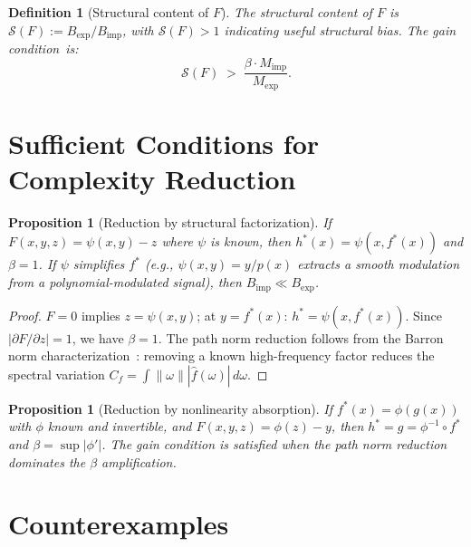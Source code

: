 \documentclass[12pt]{article}
\newtheorem{proposition}[theorem]{Proposition}
\newtheorem{definition}[theorem]{Definition}
\newcommand{\norm}[1]{\left\|#1\right\|}
\begin{document}
\begin{definition}[Structural content of $F$]
\label{def:structural_content}
The structural content of $F$ is
$\mathcal{S}(F) := B_{\mathrm{exp}} / B_{\mathrm{imp}}$,
with $\mathcal{S}(F) > 1$ indicating useful structural bias.
The gain condition~is:
\begin{equation}
  \mathcal{S}(F) \;>\;
  \frac{\beta \cdot M_{\mathrm{imp}}}{M_{\mathrm{exp}}}.
  \label{eq:condicion_S}
\end{equation}
\end{definition}

\section{Sufficient Conditions for Complexity Reduction}
\label{sec:sufficient}

\begin{proposition}[Reduction by structural factorization]
\label{prop:factorizacion}
If $F(x, y, z) = \psi(x, y) - z$ where $\psi$ is known,
then $h^*(x) = \psi(x, f^*(x))$ and $\beta = 1$.
If $\psi$ simplifies $f^*$ (e.g., $\psi(x,y) = y/p(x)$ extracts
a smooth modulation from a polynomial-modulated signal), then
$B_{\mathrm{imp}} \ll B_{\mathrm{exp}}$.
\end{proposition}

\begin{proof}
$F = 0$ implies $z = \psi(x,y)$; at $y = f^*(x)$:
$h^* = \psi(x, f^*(x))$.
Since $|\partial F/\partial z| = 1$, we have $\beta = 1$.
The path norm reduction follows from the Barron norm
characterization~\cite{Barron1993}: removing a known high-frequency
factor reduces the spectral variation $C_f = \int \norm{\omega}
|\hat{f}(\omega)|\,d\omega$.
\end{proof}

\begin{proposition}[Reduction by nonlinearity absorption]
\label{prop:absorcion}
If $f^*(x) = \phi(g(x))$ with $\phi$ known and invertible,
and $F(x,y,z) = \phi(z) - y$,
then $h^* = g = \phi^{-1} \circ f^*$ and
$\beta = \sup|\phi'|$.
The gain condition is satisfied when the path norm reduction
dominates the $\beta$ amplification.
\end{proposition}

\section{Counterexamples}
\label{sec:counter}
\end{document}
